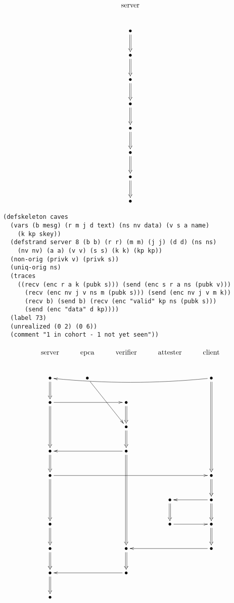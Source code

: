 \documentclass[titlepage,12pt]{article}
\theoremstyle{definition}
\begin{document}
$$\xymatrix{
\txt{\strut server}\\
\bullet\ar@{=>}[d]\\
\bullet\ar@{=>}[d]\\
\bullet\ar@{=>}[d]\\
\bullet\ar@{=>}[d]\\
\bullet\ar@{=>}[d]\\
\bullet\ar@{=>}[d]\\
\bullet\ar@{=>}[d]\\
\bullet}$$

\begin{verbatim}
(defskeleton caves
  (vars (b mesg) (r m j d text) (ns nv data) (v s a name)
    (k kp skey))
  (defstrand server 8 (b b) (r r) (m m) (j j) (d d) (ns ns)
    (nv nv) (a a) (v v) (s s) (k k) (kp kp))
  (non-orig (privk v) (privk s))
  (uniq-orig ns)
  (traces
    ((recv (enc r a k (pubk s))) (send (enc s r a ns (pubk v)))
      (recv (enc nv j v ns m (pubk s))) (send (enc nv j v m k))
      (recv b) (send b) (recv (enc "valid" kp ns (pubk s)))
      (send (enc "data" d kp))))
  (label 73)
  (unrealized (0 2) (0 6))
  (comment "1 in cohort - 1 not yet seen"))
\end{verbatim}

$$\xymatrix{
\txt{\strut server}&\txt{\strut epca}&\txt{\strut verifier}&\txt{\strut attester}&\txt{\strut client}\\
\bullet\ar@{=>}[d]&\bullet\ar[rdd]&&&\bullet\ar@{=>}[dddd]\ar@/^/[llll]\\
\bullet\ar@{=>}[dd]\ar[rr]&&\bullet\ar@{=>}[d]&&\\
&&\bullet\ar@{=>}[d]&&\\
\bullet\ar@{=>}[d]&&\bullet\ar@{=>}[dddd]\ar[ll]&&\\
\bullet\ar@{=>}[dd]\ar[rrrr]&&&&\bullet\ar@{=>}[d]\\
&&&\bullet\ar@{=>}[d]&\bullet\ar@{=>}[d]\ar[l]\\
\bullet\ar@{=>}[d]&&&\bullet\ar[r]&\bullet\ar@{=>}[d]\\
\bullet\ar@{=>}[d]&&\bullet\ar@{=>}[d]&&\bullet\ar[ll]\\
\bullet\ar@{=>}[d]&&\bullet\ar[ll]&&\\
\bullet&&&&}$$
\end{document}
